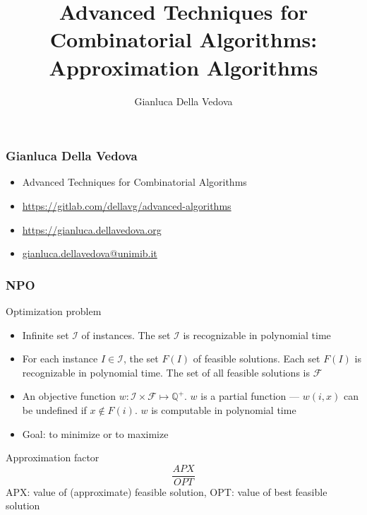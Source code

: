 \documentclass[12pt,aspectratio=169]{beamer}
\author{Gianluca Della Vedova}
\title[Advanced Algorithms]{Advanced Techniques for Combinatorial Algorithms:
Approximation Algorithms}
\institute[]{Univ. Milano--Bicocca\\
  \texttt{https://gianluca.dellavedova.org}}
\begin{document}
\begin{frame}
  \titlepage
\end{frame}


\begin{frame}\frametitle{Gianluca Della Vedova}
  \begin{itemize}
  \item
                Advanced Techniques for Combinatorial Algorithms
\item
{\small\url{https://gitlab.com/dellavg/advanced-algorithms}}
  \item
{\small\url{https://gianluca.dellavedova.org}}
  \item
{\small\url{gianluca.dellavedova@unimib.it}}
  \end{itemize}
\end{frame}

\begin{frame}\frametitle{NPO}
  \begin{block}{Optimization problem}
      \begin{itemize}
  \item
    Infinite set $\mathcal{I}$ of instances.
%
    The set $\mathcal{I}$ is recognizable in polynomial time
  \item
    For each instance $I\in\mathcal{I}$, the set $F(I)$ of feasible solutions.
%
    Each set $F(I)$ is recognizable in polynomial time.
%
    The set of all feasible solutions is $\mathcal{F}$
  \item
    An objective function $w: \mathcal{I} \times \mathcal{F}\mapsto \mathbb{Q}^{+}$.
%
    $w$ is a partial function --- $w(i,x)$ can be undefined if $x\notin F(i)$.
%
    $w$ is computable in polynomial time
  \item
    Goal: to minimize or to maximize
  \end{itemize}
\end{block}
\begin{block}{Approximation factor}
  $$\frac{APX}{OPT}$$
  APX: value of (approximate) feasible solution, OPT: value of best feasible solution
  \end{block}
\end{frame}
\end{document}
